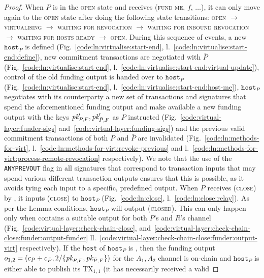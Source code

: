 \begin{proof}
  When $P$ is in the \textsc{open} state and receives (\textsc{fund me}, $f$,
  $\dots$), it can only move again to the \textsc{open} state after doing the
  following state transitions: \textsc{open} $\rightarrow$ \textsc{virtualising}
  $\rightarrow$ \textsc{waiting for revocation} $\rightarrow$ \textsc{waiting
  for inbound revocation} $\rightarrow$ \textsc{waiting for hosts ready}
  $\rightarrow$ \textsc{open}. During this sequence of events, a new
  $\texttt{host}_P$ is defined (Fig.~\ref{code:ln:virtualise:start-end},
  l.~\ref{code:ln:virtualise:start-end:define}), new commitment transactions are
  negotiated with $\bar{P}$ (Fig.~\ref{code:ln:virtualise:start-end},
  l.~\ref{code:ln:virtualise:start-end:virtual-update}), control of the old
  funding output is handed over to $\texttt{host}_P$
  (Fig.~\ref{code:ln:virtualise:start-end},
  l.~\ref{code:ln:virtualise:start-end:host-me}), $\texttt{host}_P$ negotiates
  with its counterparty a new set of transactions and signatures that spend the
  aforementioned funding output and make available a new funding output with the
  keys $\textit{pk}_{P, F}', \textit{pk}_{\bar{P}, F}'$ as $P$ instructed
  (Fig.~\ref{code:virtual-layer:funder-sigs}
  and~\ref{code:virtual-layer:funding-sigs}) and the previous valid commitment
  transactions of both $P$ and $\bar{P}$ are invalidated
  (Fig.~\ref{code:ln:methods-for-virt},
  l.~\ref{code:ln:methods-for-virt:revoke-previous} and
  l.~\ref{code:ln:methods-for-virt:process-remote-revocation} respectively). We
  note that the use of the \texttt{ANYPREVOUT} flag in all signatures that
  correspond to transaction inputs that may spend various different transaction
  outputs ensures that this is possible, as it avoids tying each input to a
  specific, predefined output.  When $P$ receives (\textsc{close}) by
  \environment, it inputs (\textsc{close}) to $\texttt{host}_P$
  (Fig.~\ref{code:ln:close}, l.~\ref{code:ln:close:relay}).  As per the Lemma
  conditions, $\texttt{host}_P$ will output (\textsc{closed}). This can only
  happen only when \ledger contains a suitable output for both $P$'s and $R$'s
  channel (Fig.~\ref{code:virtual-layer:check-chain-close},
  and~\ref{code:virtual-layer:check-chain-close:funder:output-funder}
  ll.~\ref{code:virtual-layer:check-chain-close:funder:output-virt}
  respectively). If the \texttt{host} of $\texttt{host}_P$ is \ledger, then the
  funding output $o_{1, 2} = (c_P + c_{\bar{P}}, 2/\{\textit{pk}_{P, F}, \textit{pk}_{\bar{P},
  F}\})$ for the $A_1, A_2$ channel is on-chain and $\texttt{host}_P$ is either
  able to publish its $\mathrm{TX}_{1, 1}$ (it has necessarily received a valid

\end{proof}
